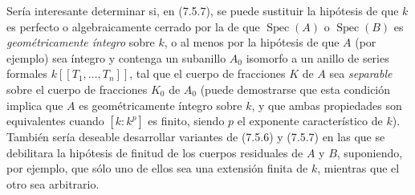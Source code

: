 \begin{remark}[7.5.8]
\label{IV.2.s7.5.8-fr}
Sería interesante determinar si, en (7.5.7), se puede sustituir
la hipótesis de que $k$ es perfecto o algebraicamente cerrado por la de que
$\operatorname{Spec}(A)$ o $\operatorname{Spec}(B)$ es \emph{geométricamente
íntegro} sobre $k$, o al menos por la hipótesis de que $A$ (por ejemplo) sea
íntegro y contenga un subanillo $A_0$ isomorfo a un anillo de series
formales $k[[T_1,\ldots,T_n]]$, tal que el cuerpo de fracciones $K$ de $A$ sea
\emph{separable} sobre el cuerpo de fracciones $K_0$ de $A_0$ (puede demostrarse que esta
condición implica que $A$ es geométricamente íntegro sobre $k$, y que
ambas propiedades son equivalentes cuando $[k:k^p]$ es finito, siendo $p$
el exponente característico de $k$). También sería deseable desarrollar
variantes de (7.5.6) y (7.5.7) en las que se debilitara la hipótesis de finitud
de los cuerpos residuales de $A$ y $B$, suponiendo, por ejemplo, que sólo uno de
ellos sea una extensión finita de $k$, mientras que el otro sea arbitrario.
\end{remark}
